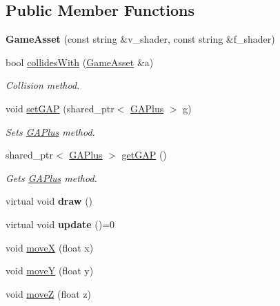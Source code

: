 \subsection*{Public Member Functions}
\begin{DoxyCompactItemize}
\item 
\hypertarget{classGameAsset_ac6d2340f41dd95e71892327dae4e1585}{{\bfseries Game\-Asset} (const string \&v\-\_\-shader, const string \&f\-\_\-shader)}\label{classGameAsset_ac6d2340f41dd95e71892327dae4e1585}

\item 
bool \hyperlink{classGameAsset_a612793ce2a354d2f8839a779d0ca2227}{collides\-With} (\hyperlink{classGameAsset}{Game\-Asset} \&a)
\begin{DoxyCompactList}\small\item\em Collision method. \end{DoxyCompactList}\item 
void \hyperlink{classGameAsset_aa4e2e9faf5cc690677549cbaf30ab80a}{set\-G\-A\-P} (shared\-\_\-ptr$<$ \hyperlink{classGAPlus}{G\-A\-Plus} $>$ g)
\begin{DoxyCompactList}\small\item\em Sets \hyperlink{classGAPlus}{G\-A\-Plus} method. \end{DoxyCompactList}\item 
\hypertarget{classGameAsset_a4d64bc9652249a4d5512b52432b8154a}{shared\-\_\-ptr$<$ \hyperlink{classGAPlus}{G\-A\-Plus} $>$ \hyperlink{classGameAsset_a4d64bc9652249a4d5512b52432b8154a}{get\-G\-A\-P} ()}\label{classGameAsset_a4d64bc9652249a4d5512b52432b8154a}

\begin{DoxyCompactList}\small\item\em Gets \hyperlink{classGAPlus}{G\-A\-Plus} method. \end{DoxyCompactList}\item 
\hypertarget{classGameAsset_a2d7e18a8f1dd8ba89ed1bd14f2affeab}{virtual void {\bfseries draw} ()}\label{classGameAsset_a2d7e18a8f1dd8ba89ed1bd14f2affeab}

\item 
\hypertarget{classGameAsset_a42688ec8f02e201eaaa01e74a112083f}{virtual void {\bfseries update} ()=0}\label{classGameAsset_a42688ec8f02e201eaaa01e74a112083f}

\item 
void \hyperlink{classGameAsset_a9a3d6f67fb27e862458a02a7a7eb55dd}{move\-X} (float x)
\item 
void \hyperlink{classGameAsset_a5252c2f4119fdc5be9bc8827fb351374}{move\-Y} (float y)
\item 
void \hyperlink{classGameAsset_adfd83d678c0266dfc919bae6b6543495}{move\-Z} (float z)
\end{DoxyCompactItemize}
